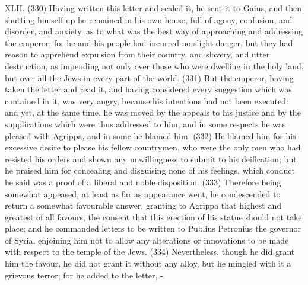 XLII. (330) Having written this letter and sealed it, he sent it to Gaius, and then shutting himself up
he remained in his own house, full of agony, confusion, and disorder, and anxiety, as to what was
the best way of approaching and addressing the emperor; for he and his people had incurred no
slight danger, but they had reason to apprehend expulsion from their country, and slavery, and utter
destruction, as impending not only over those who were dwelling in the holy land, but over all the
Jews in every part of the world. (331) But the emperor, having taken the letter and read it, and
having considered every suggestion which was contained in it, was very angry, because his
intentions had not been executed: and yet, at the same time, he was moved by the appeals to his
justice and by the supplications which were thus addressed to him, and in some respects he was
pleased with Agrippa, and in some he blamed him. (332) He blamed him for his excessive desire to
please his fellow countrymen, who were the only men who had resisted his orders and shown any
unwillingness to submit to his deification; but he praised him for concealing and disguising none of
his feelings, which conduct he said was a proof of a liberal and noble disposition. (333) Therefore
being somewhat appeased, at least as far as appearance went, he condescended to return a
somewhat favourable answer, granting to Agrippa that highest and greatest of all favours, the
consent that this erection of his statue should not take place; and he commanded letters to be
written to Publius Petronius the governor of Syria, enjoining him not to allow any alterations or
innovations to be made with respect to the temple of the Jews. (334) Nevertheless, though he did
grant him the favour, he did not grant it without any alloy, but he mingled with it a grievous terror; for
he added to the letter, -

